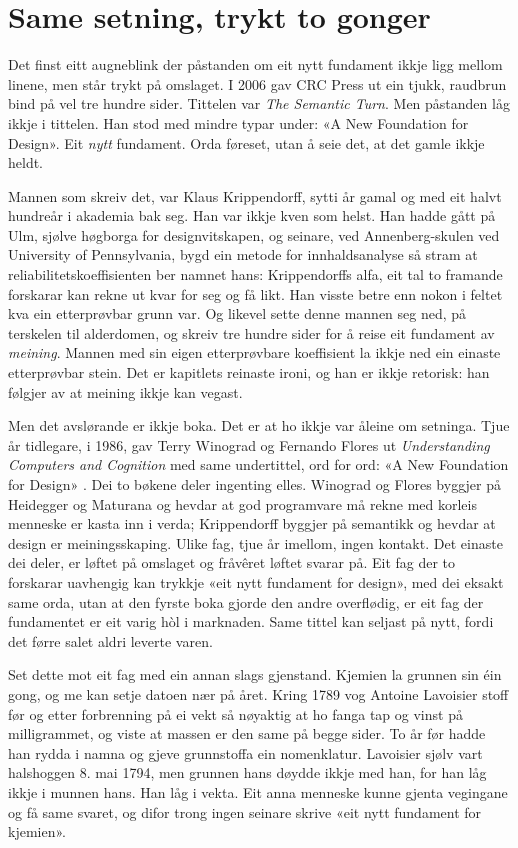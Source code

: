 \section{Same setning, trykt to gonger}

Det finst eitt augneblink der påstanden om eit nytt fundament ikkje ligg mellom linene, men står trykt på omslaget. I 2006 gav CRC Press ut ein tjukk, raudbrun bind på vel tre hundre sider. Tittelen var \textit{The Semantic Turn}. Men påstanden låg ikkje i tittelen. Han stod med mindre typar under: «A New Foundation for Design». Eit \emph{nytt} fundament. Orda føreset, utan å seie det, at det gamle ikkje heldt.

Mannen som skreiv det, var Klaus Krippendorff, sytti år gamal og med eit halvt hundreår i akademia bak seg. Han var ikkje kven som helst. Han hadde gått på Ulm, sjølve høgborga for designvitskapen, og seinare, ved Annenberg-skulen ved University of Pennsylvania, bygd ein metode for innhaldsanalyse så stram at reliabilitetskoeffisienten ber namnet hans: Krippendorffs alfa, eit tal to framande forskarar kan rekne ut kvar for seg og få likt. Han visste betre enn nokon i feltet kva ein etterprøvbar grunn var. Og likevel sette denne mannen seg ned, på terskelen til alderdomen, og skreiv tre hundre sider for å reise eit fundament av \emph{meining}. Mannen med sin eigen etterprøvbare koeffisient la ikkje ned ein einaste etterprøvbar stein. Det er kapitlets reinaste ironi, og han er ikkje retorisk: han følgjer av at meining ikkje kan vegast.

Men det avslørande er ikkje boka. Det er at ho ikkje var åleine om setninga. Tjue år tidlegare, i 1986, gav Terry Winograd og Fernando Flores ut \textit{Understanding Computers and Cognition} med same undertittel, ord for ord: «A New Foundation for Design» \autocite{winograd1986}. Dei to bøkene deler ingenting elles. Winograd og Flores byggjer på Heidegger og Maturana og hevdar at god programvare må rekne med korleis menneske er kasta inn i verda; Krippendorff byggjer på semantikk og hevdar at design er meiningsskaping. Ulike fag, tjue år imellom, ingen kontakt. Det einaste dei deler, er løftet på omslaget og fråvêret løftet svarar på. Eit fag der to forskarar uavhengig kan trykkje «eit nytt fundament for design», med dei eksakt same orda, utan at den fyrste boka gjorde den andre overflødig, er eit fag der fundamentet er eit varig hòl i marknaden. Same tittel kan seljast på nytt, fordi det førre salet aldri leverte varen.

Set dette mot eit fag med ein annan slags gjenstand. Kjemien la grunnen sin éin gong, og me kan setje datoen nær på året. Kring 1789 vog Antoine Lavoisier stoff før og etter forbrenning på ei vekt så nøyaktig at ho fanga tap og vinst på milligrammet, og viste at massen er den same på begge sider. To år før hadde han rydda i namna og gjeve grunnstoffa ein nomenklatur. Lavoisier sjølv vart halshoggen 8. mai 1794, men grunnen hans døydde ikkje med han, for han låg ikkje i munnen hans. Han låg i vekta. Eit anna menneske kunne gjenta vegingane og få same svaret, og difor trong ingen seinare skrive «eit nytt fundament for kjemien».

